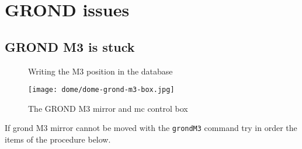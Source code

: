 \documentclass[11pt,fleqn,a4paper]{book}
\begin{document}
\section{GROND issues}
\subsection{GROND M3 is stuck}
\begin{figure}[t!]
\begin{minipage}{0.28\linewidth}
\end{minipage}
\hspace{0.02\linewidth}
\begin{minipage}{0.7\linewidth}
\end{minipage}
\caption[Writing the GROND M3 position to the database]{Writing the \gls{M3} position in the database}
\label{fig:ccs-grondM3}
\end{figure}

\begin{figure}
\texttt{[image: dome/dome-grond-m3-box.jpg]}
\caption[GROND M3 mirror and MC control box]{The GROND \gls{M3} mirror and \gls{mc} control box}
\label{fig:grondM3-box}
\end{figure}

If \gls{grond} \gls{M3} mirror cannot be moved with the \texttt{\gls{grondM3}} command try in order the items of the procedure below.
\end{document}
